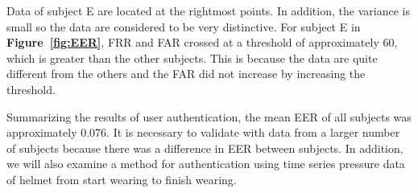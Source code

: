 \documentclass[sigchi,authordraft]{acmart}
\newcommand\figref[1]{\textbf{Figure~\ref{fig:#1}}}
\begin{document}

Data of subject E are located at the rightmost points. In addition, the variance is small so the data are considered to be very distinctive. For subject E in \figref{EER}, FRR and FAR crossed at a threshold of approximately 60, which is greater than the other subjects. This is because the data are quite different from the others and the FAR did not increase by increasing the threshold.\par


Summarizing the results of user authentication, the mean EER of all subjects was approximately 0.076. It is necessary to validate with data from a larger number of subjects because there was a difference in EER between subjects. 
In addition, we will also examine a method for authentication using time series pressure data of helmet from start wearing to finish wearing.

\end{document}
